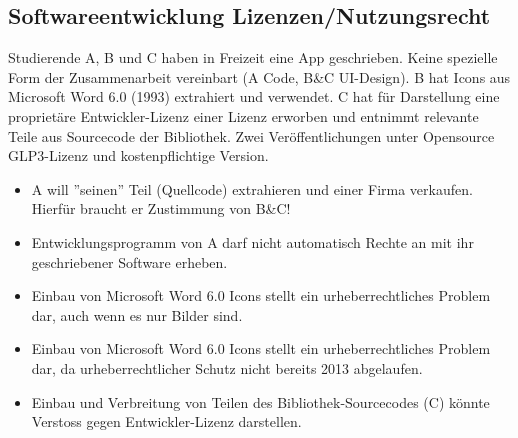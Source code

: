 \subsection{Softwareentwicklung Lizenzen/Nutzungsrecht}
Studierende A, B und C haben in Freizeit eine App geschrieben. Keine spezielle Form der Zusammenarbeit vereinbart (A Code, B\&C UI-Design). B hat Icons aus Microsoft Word 6.0 (1993) extrahiert und verwendet. C hat für Darstellung eine proprietäre Entwickler-Lizenz einer Lizenz erworben und entnimmt relevante Teile aus Sourcecode der Bibliothek. Zwei Veröffentlichungen unter Opensource GLP3-Lizenz und kostenpflichtige Version.
\begin{itemize}
	\item A will ''seinen'' Teil (Quellcode) extrahieren und einer Firma verkaufen. Hierfür braucht er Zustimmung von B\&C!
	\item Entwicklungsprogramm von A darf nicht automatisch Rechte an mit ihr geschriebener Software erheben.
	\item Einbau von Microsoft Word 6.0 Icons stellt ein urheberrechtliches Problem dar, auch wenn es nur Bilder sind.
	\item Einbau von Microsoft Word 6.0 Icons stellt ein urheberrechtliches Problem dar, da urheberrechtlicher Schutz nicht bereits 2013 abgelaufen.
	\item Einbau und Verbreitung von Teilen des Bibliothek-Sourcecodes (C) könnte Verstoss gegen Entwickler-Lizenz darstellen.
\end{itemize}